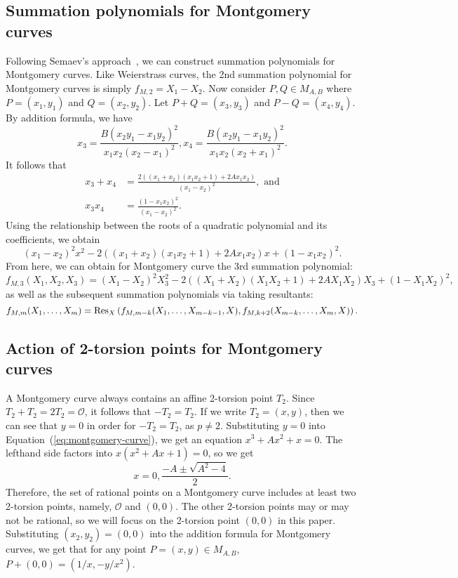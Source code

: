 \subsection{Summation polynomials for Montgomery curves}

Following Semaev's approach~\cite{DBLP:journals/iacr/Semaev04}, we can
construct summation polynomials for Montgomery curves.
%
Like Weierstrass curves, the 2nd summation polynomial for Montgomery
curves is simply $f_{M,2} = X_1 - X_2$.
%
Now consider $P,Q\in M_{A, B}$ where $P=(x_1, y_1)$ and
$Q=(x_2, y_2)$.
%
Let $P+Q=(x_3, y_3)$ and $P-Q=(x_4, y_4)$.
%
By addition formula, we have
\[ x_3 = \frac{B(x_2y_1 - x_1y_2)^2} {x_1x_2(x_2 - x_1)^2},
  x_4 =\frac{B(x_2y_1 - x_1y_2)^2} {x_1x_2(x_2 + x_1)^2}. \]
%
It follows that
%
\begin{align*}
  x_3 + x_4&=\frac{2\left((x_1 + x_2)(x_1x_2 + 1) + 2Ax_1x_2\right)}{(x_1 - x_2)^2},\text{ and} \\
  x_3x_4&=\frac{(1 - x_1x_2)^2}{(x_1 - x_2)^2}.
\end{align*}
%
Using the relationship between the roots of a quadratic polynomial and
its coefficients, we obtain
\[ (x_1 - x_2)^2x^2 - 2\left((x_1 + x_2)(x_1x_2 + 1) +
    2Ax_1x_2\right)x + (1 - x_1x_2)^2. \]
%
From here, we can obtain for Montgomery curve the 3rd summation
polynomial:
\[ f_{M,3}(X_1,X_2,X_3) = (X_1 - X_2)^2X_3^2 - 2\left((X_1 +
    X_2)(X_1X_2 + 1) + 2AX_1X_2\right)X_3 + (1-X_1X_2)^2, \]
%
as well as the subsequent summation polynomials via taking resultants:
\[ f_{M,m}(X_1,\ldots,X_m) =
  \operatorname{Res}_X\left(f_{M,m-k}(X_1,\ldots,X_{m-k-1},X),f_{M,k+2}(X_{m-k},\ldots,X_m,X)\right). \]
\subsection{Action of 2-torsion points for Montgomery curves} \label{subsec:TSPL}
A Montgomery curve always contains an affine 2-torsion point $T_2$.
%
Since $T_2+T_2=2T_2=\mathcal O$, it follows that $-T_2=T_2$.
%
If we write $T_2=(x,y)$, then we can see that $y=0$ in order for
$-T_2=T_2$, as $p\neq 2$.
%
Substituting $y=0$ into Equation~(\ref{eq:montgomery-curve}),
we get an equation $x^3+Ax^2+x=0$.
%
The lefthand side factors into $x(x^2+Ax+1)=0$, so we get \[
  x=0,\frac{-A\pm\sqrt{A^2 - 4}}{2}. \]
%
Therefore, the set of rational points on a Montgomery curve includes
at least two 2-torsion points, namely, $\mathcal O$ and $(0,0)$.
%
The other 2-torsion points may or may not be rational, so we will
focus on the 2-torsion point $(0,0)$ in this paper.
%
Substituting $(x_2,y_2)=(0,0)$ into the addition formula for
Montgomery curves, we get that for any point $P=(x,y)\in M_{A,B}$,
$P+(0,0)=(1/x,-y/x^2)$.

